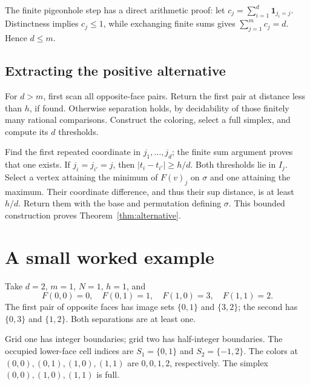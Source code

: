 \documentclass[11pt,a4paper]{article}
\theoremstyle{definition}
\newcommand{\one}[1]{\mathbf 1_{#1}}
\begin{document}
The finite pigeonhole step has a direct arithmetic proof:
let $c_j=\sum_{i=1}^d\one{j_i=j}$. Distinctness implies
$c_j\leq1$, while exchanging finite sums gives
$\sum_{j=1}^m c_j=d$. Hence $d\leq m$.

\subsection{Extracting the positive alternative}
For $d>m$, first scan all opposite-face pairs. Return the first
pair at distance less than $h$, if found. Otherwise separation
holds, by decidability of those finitely many rational comparisons.
Construct the coloring, select a full simplex, and compute
its $d$ thresholds.

Find the first repeated coordinate in $j_1,\ldots,j_d$; the
finite sum argument proves that one exists. If
$j_i=j_{i'}=j$, then $|t_i-t_{i'}|\geq h/d$.
Both thresholds lie in $I_j$. Select a vertex attaining
the minimum of $F(v)_j$ on $\sigma$ and one attaining the
maximum. Their coordinate difference, and thus their sup
distance, is at least $h/d$. Return them with the base and
permutation defining $\sigma$.
This bounded construction proves Theorem~\ref{thm:alternative}.

\section{A small worked example}
Take $d=2$, $m=1$, $N=1$, $h=1$, and
\[
 F(0,0)=0,\quad F(0,1)=1,\quad F(1,0)=3,\quad F(1,1)=2.
\]
The first pair of opposite faces has image sets $\{0,1\}$ and
$\{3,2\}$; the second has $\{0,3\}$ and $\{1,2\}$.
Both separations are at least one.

Grid one has integer boundaries; grid two has half-integer
boundaries. The occupied lower-face cell indices are
$S_1=\{0,1\}$ and $S_2=\{-1,2\}$. The colors at
$(0,0),(0,1),(1,0),(1,1)$ are $0,0,1,2$, respectively.
The simplex $(0,0),(1,0),(1,1)$ is full.
\end{document}
